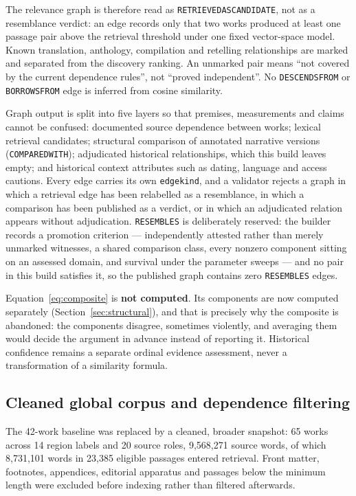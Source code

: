\documentclass[11pt]{article}
\DeclareRobustCommand{\_}{\textunderscore\allowbreak}
\newcommand{\field}[1]{\texttt{\small #1}}
\begin{document}
The relevance graph is therefore read as \field{RETRIEVED\_AS\_CANDIDATE}, not as
a resemblance verdict: an edge records only that two works produced at least one
passage pair above the retrieval threshold under one fixed vector-space model.
Known translation, anthology, compilation and retelling relationships are marked
and separated from the discovery ranking. An unmarked pair means ``not covered by
the current dependence rules'', not ``proved independent''. No
\field{DESCENDS\_FROM} or \field{BORROWS\_FROM} edge is inferred from cosine
similarity.

Graph output is split into five layers so that premises, measurements and claims
cannot be confused: documented source dependence between works; lexical retrieval
candidates; structural comparison of annotated narrative versions
(\field{COMPARED\_WITH}); adjudicated historical relationships, which this build
leaves empty; and historical context attributes such as dating, language and
access cautions. Every edge carries its own \field{edge\_kind}, and a validator
rejects a graph in which a retrieval edge has been relabelled as a resemblance,
in which a comparison has been published as a verdict, or in which an
adjudicated relation appears without adjudication. \field{RESEMBLES} is
deliberately reserved: the builder records a promotion criterion ---
independently attested rather than merely unmarked witnesses, a shared comparison
class, every nonzero component sitting on an assessed domain, and survival under
the parameter sweeps --- and no pair in this build satisfies it, so the published
graph contains zero \field{RESEMBLES} edges.

Equation~\eqref{eq:composite} is \textbf{not computed}. Its components are now
computed separately (Section~\ref{sec:structural}), and that is precisely why the
composite is abandoned: the components disagree, sometimes violently, and
averaging them would decide the argument in advance instead of reporting it.
Historical confidence remains a separate ordinal evidence assessment, never a
transformation of a similarity formula.

\subsection{Cleaned global corpus and dependence filtering}

The 42-work baseline was replaced by a cleaned, broader snapshot: 65 works across
14 region labels and 20 source roles, 9{,}568{,}271 source words, of which
8{,}731{,}101 words in 23{,}385 eligible passages entered retrieval. Front matter,
footnotes, appendices, editorial apparatus and passages below the minimum length
were excluded before indexing rather than filtered afterwards.
\end{document}
